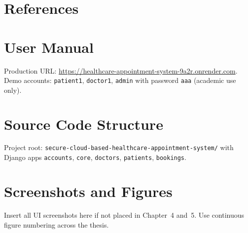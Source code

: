 \documentclass[12pt,a4paper]{report}
\begin{document}










\chapter*{References}
\printbibliography[heading=none]

\appendix
\chapter{User Manual}
Production URL: \url{https://healthcare-appointment-system-9a2r.onrender.com}. Demo accounts: \texttt{patient1}, \texttt{doctor1}, \texttt{admin} with password \texttt{aaa} (academic use only).

\chapter{Source Code Structure}
Project root: \texttt{secure-cloud-based-healthcare-appointment-system/} with Django apps \texttt{accounts}, \texttt{core}, \texttt{doctors}, \texttt{patients}, \texttt{bookings}.

\chapter{Screenshots and Figures}
Insert all UI screenshots here if not placed in Chapter~4 and~5. Use continuous figure numbering across the thesis.
\end{document}
